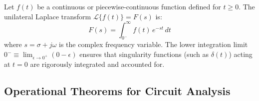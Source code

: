 \documentclass[12pt,a4paper]{article}
\begin{document}
\begin{tcolorbox}[defbox, title={\textbf{Unilateral Laplace Transform}}]
Let $f(t)$ be a continuous or piecewise-continuous function defined for $t \ge 0$. The unilateral Laplace transform $\mathcal{L}\{f(t)\} = F(s)$ is:
\begin{equation}
  F(s) = \int_{0^-}^\infty f(t)\,e^{-st}\,dt
\end{equation}
where $s = \sigma + j\omega$ is the complex frequency variable. The lower integration limit $0^- \equiv \lim_{\epsilon \to 0^+} (0 - \epsilon)$ ensures that singularity functions (such as $\delta(t)$) acting at $t=0$ are rigorously integrated and accounted for.
\end{tcolorbox}

\subsection{Operational Theorems for Circuit Analysis}
\end{document}
